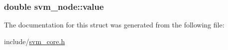 \subsubsection[{value}]{\setlength{\rightskip}{0pt plus 5cm}double svm\+\_\+node\+::value}\hypertarget{structsvm__node_a9ca47b8a156238d04213453f3b89e177}{}\label{structsvm__node_a9ca47b8a156238d04213453f3b89e177}


The documentation for this struct was generated from the following file\+:\begin{DoxyCompactItemize}
\item 
include/\hyperlink{svm__core_8h}{svm\+\_\+core.\+h}\end{DoxyCompactItemize}
